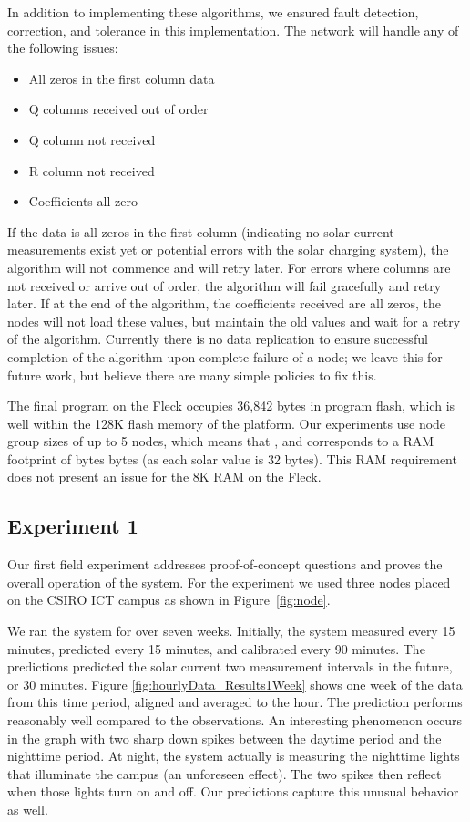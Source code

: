 \documentclass[prodmode,acmtosn]{acmsmall}
\begin{document}
In addition to implementing these algorithms, we ensured fault detection, correction, and tolerance in this implementation.
The network will handle any of the following issues:

\begin{itemize}
\item All zeros in the first column data
\item Q columns received out of order
\item Q column not received
\item R column not received
\item Coefficients all zero
\end{itemize}

If the data is all zeros in the first column (indicating no solar current measurements exist yet or potential errors with the solar charging system), the algorithm will not commence and will retry later.
For errors where columns are not received or arrive out of order, the algorithm will fail gracefully and retry later.
If at the end of the algorithm, the coefficients received are all zeros, the nodes will not load these values, but maintain the old values and wait for a retry of the algorithm.
Currently there is no data replication to ensure successful completion of the algorithm upon complete failure of a node; we leave this for future work, but believe there are many simple policies to fix this. 

The final program on the Fleck occupies 36,842 bytes in program flash, which is well within the 128K flash memory of the platform. Our experiments use node group sizes of up to 5 nodes, which  means that , and corresponds to a RAM footprint of  bytes  bytes (as each solar value is 32 bytes).  This RAM requirement does not present an issue for the 8K RAM on the Fleck.

\subsection{Experiment 1}
Our first field experiment addresses proof-of-concept questions and proves the overall operation of the system.
For the experiment we used three nodes placed on the CSIRO ICT campus as shown in Figure~\ref{fig:node}.

We ran the system for over seven weeks.
Initially, the system measured every 15 minutes, predicted every 15 minutes, and calibrated every 90 minutes.
The predictions predicted the solar current two measurement intervals in the future, or 30 minutes.
Figure \ref{fig:hourlyData_Results1Week} shows one week of the data from this time period, aligned and averaged to the hour.
The prediction performs reasonably well compared to the observations.
An interesting phenomenon occurs in the graph with two sharp down spikes between the daytime period and the nighttime period.
At night, the system actually is measuring the nighttime lights that illuminate the campus (an unforeseen effect).
The two spikes then reflect when those lights turn on and off.
Our predictions capture this unusual behavior as well.
\end{document}
